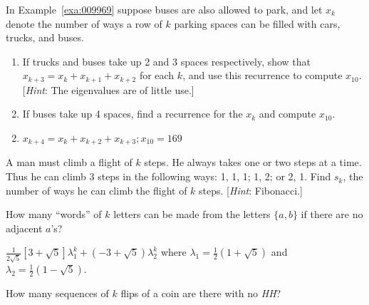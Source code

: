 \begin{multicols}{2}
\begin{ex}
\begin{sol}
\begin{enumerate}[label={\alph*.}]
\end{enumerate}
\end{sol}
\end{ex}

\begin{ex}
In Example~\ref{exa:009969} suppose buses are also allowed to park, and let $x_{k}$ denote the number of ways a row of $k$ parking spaces can be filled with cars, trucks, and buses.


\begin{enumerate}[label={\alph*.}]
\item If trucks and buses take up 2 and 3 spaces respectively, show that $x_{k+3} = x_{k} + x_{k+1} + x_{k+2}$ for each $k$, and use this recurrence to compute $x_{10}$. [\textit{Hint}: The eigenvalues are of little use.]

\item If buses take up 4 spaces, find a recurrence for the $x_{k}$ and compute $x_{10}$.

\end{enumerate}
\begin{sol}
\begin{enumerate}[label={\alph*.}]
\setcounter{enumi}{1}
\item  $x_{k+4} = x_k + x_{k+2} + x_{k+3}; x_{10} = 169$


\end{enumerate}
\end{sol}
\end{ex}

\begin{ex}
A man must climb a flight of $k$
 steps. He always takes one or two steps at a time. Thus he can climb 3 
steps in the following ways: 1, 1, 1; 1, 2; or 2, 1. Find $s_{k}$, the number of ways he can climb the flight of $k$ steps. [\textit{Hint}: Fibonacci.]
\end{ex}

\begin{ex}
How many ``words'' of $k$ letters can be made from the letters $\{a, b\}$ if there are no adjacent $a$'s?

\begin{sol}
$\frac{1}{2\sqrt{5}} \left[ 3 +\sqrt{5} \right] \lambda_1^k + (-3 + \sqrt{5}) \lambda_2^k$ where $ \lambda_1 = \frac{1}{2} (1 +  \sqrt{5})$ and $ \lambda_2 = \frac{1}{2} (1 -  \sqrt{5})$. 
\end{sol}
\end{ex}

\begin{ex}
How many sequences of $k$ flips of a coin are there with no \textit{HH}?
\end{ex}


\end{multicols}
